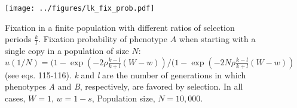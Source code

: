 \documentclass[]{article}
\begin{document}
\begin{figure}
\centering
\texttt{[image: ../figures/lk\_fix\_prob.pdf]}
\caption{Fixation in a finite population with different ratios of selection periods \(\frac{k}{l}\). Fixation probability of phenotype $A$ when starting with a single copy in a population of size $N$: $u(1/N) = (1-\exp(-2 \rho \frac{k-l}{k+l}(W-w))/(1-\exp(-2 N \rho \frac{k-l}{k+l}(W-w))$ (see eqs. 115-116).
\emph{k} and \emph{l} are the number of
generations in which phenotypes \emph{A} and \emph{B}, respectively, are favored by
selection. In all cases, $W = 1$, $w = 1-s$, Population size, \(N=10,000\).} \label{lk_fix_prob}
\end{figure}
\end{document}
